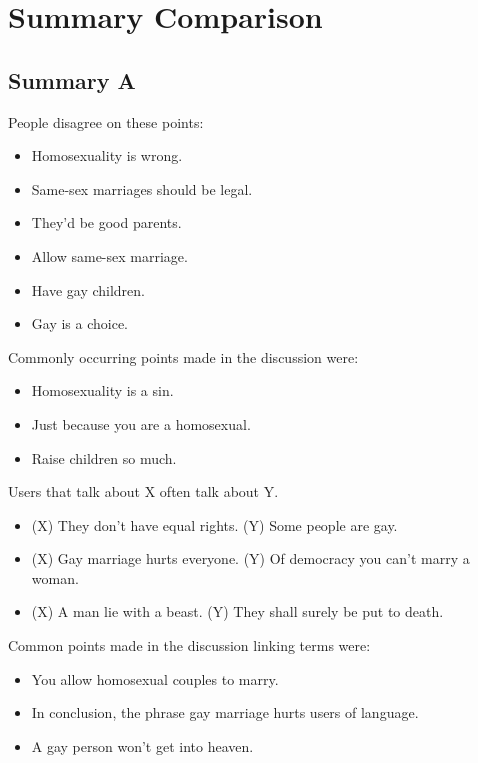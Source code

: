 \documentclass[tikz]{article}
\begin{document}
  \section*{Summary Comparison}
  \begin{multicols}{2}
    \subsection*{Summary A}
    People disagree on these points:
    \begin{itemize}[noitemsep,nolistsep,label={}]
      \item{Homosexuality is wrong.}
      \item{Same-sex marriages should be legal.}
      \item{They'd be good parents.}
      \item{Allow same-sex marriage.}
      \item{Have gay children.}
      \item{Gay is a choice.}
    \end{itemize}

    Commonly occurring points made in the discussion were:
    \begin{itemize}[noitemsep,nolistsep,label={}]
      \item{Homosexuality is a sin.}
      \item{Just because you are a homosexual.}
      \item{Raise children so much.}
    \end{itemize}

    Users that talk about X often talk about Y.
    \begin{itemize}[noitemsep,nolistsep,label={}]
      \item{(X) They don't have equal rights. (Y) Some people are gay.}
      \item{(X) Gay marriage hurts everyone. (Y) Of democracy you can't marry a woman.}
      \item{(X) A man lie with a beast. (Y) They shall surely be put to death.}
    \end{itemize}

    Common points made in the discussion linking terms were:
    \begin{itemize}[noitemsep,nolistsep,label={}]
      \item{You allow homosexual couples to marry.}
      \item{In conclusion, the phrase gay marriage hurts users of language.}
      \item{A gay person won't get into heaven.}
    \end{itemize}


\end{multicols}
\end{document}
